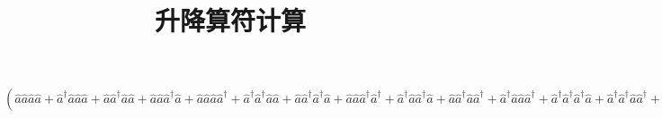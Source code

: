 \documentclass{article}
\date{}
\author{}
\title{升降算符计算}
\begin{document}
 \maketitle
 $(
 \hat{a}
 \hat{a}
 \hat{a}
 \hat{a}
 +
 \hat{a}^\dagger
 \hat{a}
 \hat{a}
 \hat{a}
 +
 \hat{a}
 \hat{a}^\dagger
 \hat{a}
 \hat{a}
 +
 \hat{a}
 \hat{a}
 \hat{a}^\dagger
 \hat{a}
 +
 \hat{a}
 \hat{a}
 \hat{a}
 \hat{a}^\dagger
 +
 \hat{a}^\dagger
 \hat{a}^\dagger
 \hat{a}
 \hat{a}
 +
 \hat{a}
 \hat{a}^\dagger
 \hat{a}^\dagger
 \hat{a}
 +
 \hat{a}
 \hat{a}
 \hat{a}^\dagger
 \hat{a}^\dagger
 +
 \hat{a}^\dagger
 \hat{a}
 \hat{a}^\dagger
 \hat{a}
 +
 \hat{a}
 \hat{a}^\dagger
 \hat{a}
 \hat{a}^\dagger
 +
 \hat{a}^\dagger
 \hat{a}
 \hat{a}
 \hat{a}^\dagger
 +
 \hat{a}^\dagger
 \hat{a}^\dagger
 \hat{a}^\dagger
 \hat{a}
 +
 \hat{a}^\dagger
 \hat{a}^\dagger
 \hat{a}
 \hat{a}^\dagger
 +
 \hat{a}^\dagger
 \hat{a}
 \hat{a}^\dagger
 \hat{a}^\dagger
 +
 \hat{a}
 \hat{a}^\dagger
 \hat{a}^\dagger
 \hat{a}^\dagger
 +
 \hat{a}^\dagger
 \hat{a}^\dagger
 \hat{a}^\dagger
 \hat{a}^\dagger
 )
 |           2 \rangle =
 \sqrt{           2 }|           0 \rangle
 +
 \sqrt{           8 }|           0 \rangle
 +
 \sqrt{          18 }|           0 \rangle
 +
 \sqrt{           4 }|           2 \rangle
 +
 \sqrt{          36 }|           2 \rangle
 +
 \sqrt{         144 }|           2 \rangle
 +
 \sqrt{          16 }|           2 \rangle
 +
 \sqrt{          81 }|           2 \rangle
 +
 \sqrt{          36 }|           2 \rangle
 +
 \sqrt{          48 }|           4 \rangle
 +
 \sqrt{         108 }|           4 \rangle
 +
 \sqrt{         192 }|           4 \rangle
 +
 \sqrt{         300 }|           4 \rangle
 +
 \sqrt{         360 }|           6 \rangle
 $
 
\end{document}
